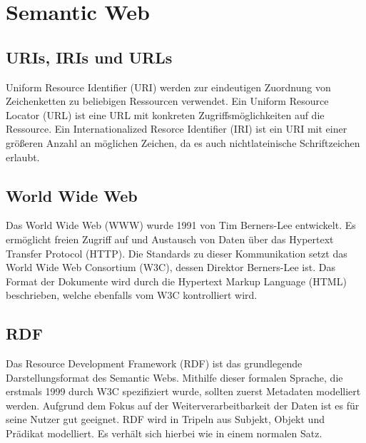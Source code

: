 \section{Semantic Web}

\subsection{URIs, IRIs und URLs}
Uniform Resource Identifier (URI) werden zur eindeutigen Zuordnung von Zeichenketten zu beliebigen Ressourcen verwendet.
Ein Uniform Resource Locator (URL) ist eine URL mit konkreten Zugriffsmöglichkeiten auf die Ressource.
Ein Internationalized Resorce Identifier (IRI) ist ein URI mit einer größeren Anzahl an möglichen Zeichen, da es auch nichtlateinische Schriftzeichen erlaubt.

\subsection{World Wide Web}
Das World Wide Web (WWW) wurde 1991 von Tim Berners-Lee entwickelt.
Es ermöglicht freien Zugriff auf und Austausch von Daten über das Hypertext Transfer Protocol (HTTP).
Die Standards zu dieser Kommunikation setzt das World Wide Web Consortium (W3C), dessen Direktor Berners-Lee ist.
Das Format der Dokumente wird durch die Hypertext Markup Language (HTML) beschrieben, welche ebenfalls vom W3C kontrolliert wird.

\subsection{RDF}
Das Resource Development Framework (RDF) ist das grundlegende Darstellungsformat des Semantic Webs.
Mithilfe dieser formalen Sprache, die erstmals 1999 durch W3C spezifiziert wurde, sollten zuerst Metadaten modelliert werden.
Aufgrund dem Fokus auf der Weiterverarbeitbarkeit der Daten ist es für seine Nutzer gut geeignet.
RDF wird in Tripeln aus Subjekt, Objekt und Prädikat modelliert. Es verhält sich hierbei wie in einem normalen Satz.

